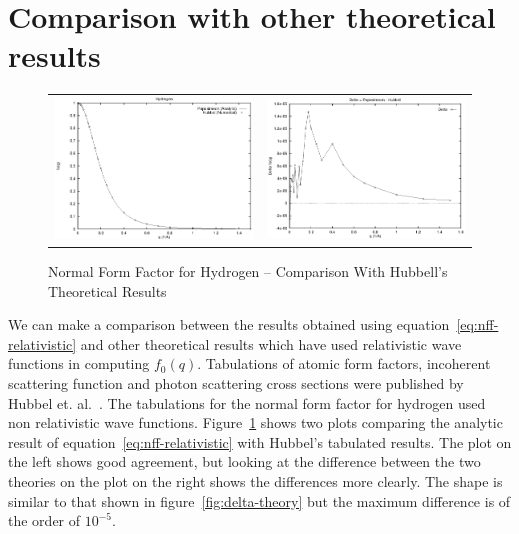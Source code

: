 \section{Comparison with other theoretical results}
    \begin{figure}[H] 
    \begin{center}
    \begin{tabular}{cc}
        \includegraphics[width=7.0cm]{hubbel_papa.eps}
        &
        \includegraphics[width=7.0cm]{delta_hubbell.eps}
    \end{tabular}
        \caption{Normal Form Factor for Hydrogen -- Comparison With Hubbell's Theoretical Results}
        \label{fig:hubbell-comparison}
    \end{center}
    \end{figure}
    We can make a comparison between the results obtained using equation~\ref{eq:nff-relativistic}
    and other theoretical results which have used relativistic wave functions in
    computing $f_0(q)$.
    Tabulations of atomic form factors, incoherent scattering function and
    photon scattering cross sections were published by Hubbel et.  al.~\cite{Hubbell-1975}.
    The tabulations for the normal form factor for hydrogen used non
    relativistic wave functions. Figure~\ref{fig:hubbell-comparison} shows two
    plots comparing the analytic result of equation~\ref{eq:nff-relativistic} with
    Hubbel's tabulated results. The plot on the left shows good agreement, but
    looking at the difference between the two theories on the plot on the right
    shows the differences more clearly. The shape is similar to that shown
    in figure~\ref{fig:delta-theory} but the maximum difference is of the order
    of $10^{-5}$.
